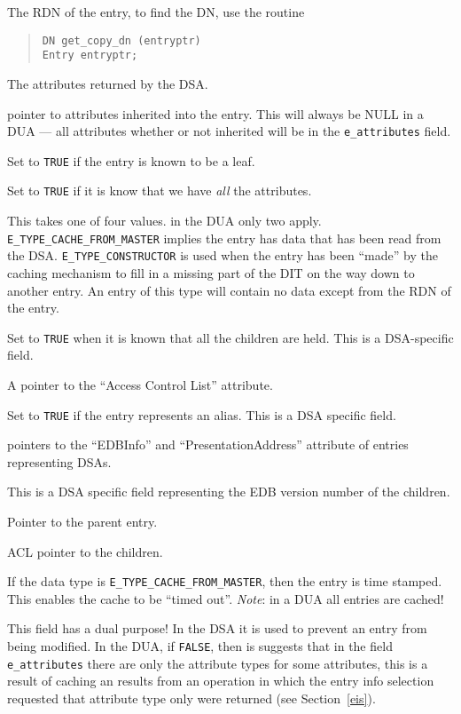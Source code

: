 \begin{describe}
\item [\verb"e\_name":] The RDN of the entry, to find the DN, use the routine
\begin{quote}\small\begin{verbatim}
DN get_copy_dn (entryptr)
Entry entryptr;
\end{verbatim}\end{quote}
\item [\verb"e\_attributes":] The attributes returned by the DSA.
\item [\verb"e\_iattr":] pointer to attributes inherited into the
entry.  This will always be NULL in a DUA --- all attributes whether or
not inherited will be in the \verb+e_attributes+ field.
\item [\verb"e\_leaf":] Set to \verb"TRUE" if the entry is known to be a leaf.
\item [\verb"e\_complete":] Set to \verb"TRUE" if it is know that we have
{\em all} the attributes.
\item [\verb"e\_data":] This takes one of four values. in the DUA only two
apply. 
\verb"E_TYPE_CACHE_FROM_MASTER" implies the entry has data that has
been read from the DSA.
\verb"E_TYPE_CONSTRUCTOR" is used when the entry has been ``made'' by the
caching mechanism to fill in a missing part of the DIT on the way down to 
another entry.  An entry of this type will contain no data except from the
RDN of the entry.
\item [\verb"e\_allchildrenpresent":] Set to \verb"TRUE" when it is known
that all the children are held.  
This is a DSA-specific field.
\item [\verb"e\_acl":] A pointer to the ``Access Control List'' attribute.
\item [\verb"e\_alias":] Set to \verb"TRUE" if the entry represents an alias.
This is a DSA specific field.
\item [\verb"e\_dsainfo":] pointers to the ``EDBInfo'' and
``PresentationAddress'' attribute of entries representing DSAs.
\item [\verb"e\_edbversion":]
This is a DSA specific field representing the EDB version number of the
children.
\item [\verb"e\_parent":] Pointer to the parent entry.
\item [\verb"e\_children":] ACL pointer to the children.
\item [\verb"e\_age":] If the data type is \verb"E_TYPE_CACHE_FROM_MASTER",
then the entry is time stamped. This enables the cache to be ``timed out''.
{\em Note}: in a DUA all entries are cached!
\item [\verb"e\_lock":] This field has a dual purpose! In the DSA it is used
to prevent an entry from being modified.  In the DUA, if \verb"FALSE", then
is suggests that in the field \verb"e_attributes" there are only the
attribute types for some attributes, this is a result of caching an results
from an operation in which the entry info selection requested that
attribute type only were returned (see Section~\ref{eis}).


\end{describe}
